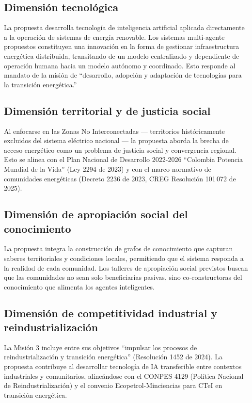 \documentclass[12pt,letterpaper]{article}
\begin{document}
\subsection*{Dimensi\'on tecnol\'ogica}

La propuesta desarrolla tecnolog\'ia de inteligencia artificial aplicada directamente a la operaci\'on de sistemas de energ\'ia renovable. Los sistemas multi-agente propuestos constituyen una innovaci\'on en la forma de gestionar infraestructura energ\'etica distribuida, transitando de un modelo centralizado y dependiente de operaci\'on humana hacia un modelo aut\'onomo y coordinado. Esto responde al mandato de la misi\'on de ``desarrollo, adopci\'on y adaptaci\'on de tecnolog\'ias para la transici\'on energ\'etica.''

\subsection*{Dimensi\'on territorial y de justicia social}

Al enfocarse en las Zonas No Interconectadas --- territorios hist\'oricamente excluidos del sistema el\'ectrico nacional --- la propuesta aborda la brecha de acceso energ\'etico como un problema de justicia social y convergencia regional. Esto se alinea con el Plan Nacional de Desarrollo 2022-2026 ``Colombia Potencia Mundial de la Vida'' (Ley 2294 de 2023) y con el marco normativo de comunidades energ\'eticas (Decreto 2236 de 2023, CREG Resoluci\'on 101\,072 de 2025).

\subsection*{Dimensi\'on de apropiaci\'on social del conocimiento}

La propuesta integra la construcci\'on de grafos de conocimiento que capturan saberes territoriales y condiciones locales, permitiendo que el sistema responda a la realidad de cada comunidad. Los talleres de apropiaci\'on social previstos buscan que las comunidades no sean solo beneficiarias pasivas, sino co-constructoras del conocimiento que alimenta los agentes inteligentes.

\subsection*{Dimensi\'on de competitividad industrial y reindustrializaci\'on}

La Misi\'on 3 incluye entre sus objetivos ``impulsar los procesos de reindustrializaci\'on y transici\'on energ\'etica'' (Resoluci\'on 1452 de 2024). La propuesta contribuye al desarrollar tecnolog\'ia de IA transferible entre contextos industriales y comunitarios, aline\'andose con el CONPES 4129 (Pol\'itica Nacional de Reindustrializaci\'on) y el convenio Ecopetrol-Minciencias para CTeI en transici\'on energ\'etica.
\end{document}
